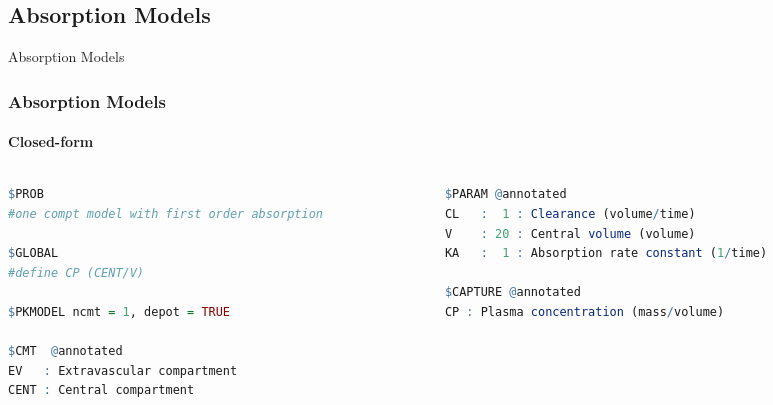 \documentclass[
	11pt, %
]{beamer}
\begin{document}
\subsection{Absorption Models}
\begin{frame}[fragile]{Absorption Models}
	\frametitle{Absorption Models}
		\framesubtitle{Closed-form} %
    \begin{columns}[c] 
		\begin{column}{0.5\textwidth} %
		\tiny
\begin{lstlisting}[language=R]
$PROB
#one compt model with first order absorption

$GLOBAL
#define CP (CENT/V)

$PKMODEL ncmt = 1, depot = TRUE

$CMT  @annotated
EV   : Extravascular compartment
CENT : Central compartment

\end{lstlisting}

\end{column}
		\begin{column}{0.5\textwidth} %
\begin{lstlisting}[language=R]
$PARAM @annotated
CL   :  1 : Clearance (volume/time)
V    : 20 : Central volume (volume)
KA   :  1 : Absorption rate constant (1/time)

$CAPTURE @annotated
CP : Plasma concentration (mass/volume)
	
	\end{lstlisting}
		\end{column}
	\end{columns}
	
	
	\end{frame}

\end{document}
